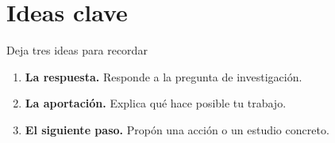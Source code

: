 \section{Ideas clave}
\begin{frame}{Deja tres ideas para recordar}
\begin{enumerate}\setlength{\itemsep}{6mm}
\item \textbf{La respuesta.} Responde a la pregunta de investigación.
\item \textbf{La aportación.} Explica qué hace posible tu trabajo.
\item \textbf{El siguiente paso.} Propón una acción o un estudio concreto.
\end{enumerate}
\end{frame}
